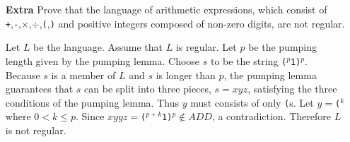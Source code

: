 \begin{enumerate}
    \item[{\bf Extra}] Prove that the language of arithmetic expressions, which consist of {\tt +},{\tt -},$\times$,$\div$,{\tt (},{\tt )} and positive integers composed of non-zero digits, are not regular.
    
    Let $L$ be the language. Assume that $L$ is regular. Let $p$ be the pumping length given by the pumping lemma. Choose $s$ to be the string {\tt (}$^p${\tt 1)}$^p$. Because $s$ is a member of $L$ and $s$ is longer than $p$, the pumping lemma guarantees that $s$ can be split into three pieces, $s=xyz$, satisfying the three conditions of the pumping lemma. Thus $y$ must consists of only {\tt (}s. Let $y=${\tt (}$^k$ where $0<k\le p$. Since $xyyz=${\tt (}$^{p+k}${\tt 1)}$^p\notin ADD$, a contradiction. Therefore $L$ is not regular.

\end{enumerate}